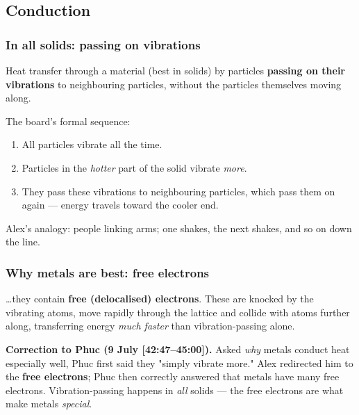 \documentclass[11pt,a4paper]{article}
\newcommand{\ts}[1]{\textup{[#1]}}       %
\begin{document}
\subsection{Conduction}

\subsubsection{In all solids: passing on vibrations}
\begin{defbox}[Conduction]
Heat transfer through a material (best in solids) by particles \textbf{passing on their
vibrations} to neighbouring particles, without the particles themselves moving along.
\end{defbox}

The board's formal sequence:
\begin{enumerate}[leftmargin=1.5em,itemsep=1pt]
  \item All particles vibrate all the time.
  \item Particles in the \emph{hotter} part of the solid vibrate \emph{more}.
  \item They pass these vibrations to neighbouring particles, which pass them on again ---
        energy travels toward the cooler end.
\end{enumerate}
Alex's analogy: people linking arms; one shakes, the next shakes, and so on down the line.

\subsubsection{Why metals are best: free electrons}
\begin{keybox}
\ldots they contain \textbf{free (delocalised) electrons}. These are knocked by the
vibrating atoms, move rapidly through the lattice and collide with atoms further along,
transferring energy \emph{much faster} than vibration-passing alone.
\end{keybox}

\begin{watchbox}
\textbf{Correction to Phuc (9 July \ts{42:47--45:00}).} Asked \emph{why} metals conduct
heat especially well, Phuc first said they "simply vibrate more." Alex redirected him to the
\textbf{free electrons}; Phuc then correctly answered that metals have many free electrons.
Vibration-passing happens in \emph{all} solids --- the free electrons are what make metals
\emph{special}.
\end{watchbox}
\end{document}
